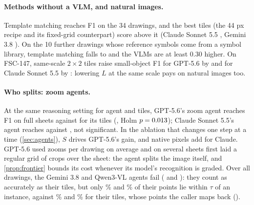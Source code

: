 \paragraph{Methods without a VLM, and natural images.} Template matching reaches \FTMdevAll{} F1 on the 34 drawings, and the best tiles (the 44 px recipe and its fixed-grid counterpart) score above it (Claude Sonnet 5.5 \FDsonnetFiveFiveAll, Gemini 3.8 \FDgemThreeEightAll). On the 10 further drawings whose reference symbols come from a symbol library, template matching falls to \XrdFTM{} and the VLMs are at least 0.30 higher. On FSC-147, same-scale $2 \times 2$ tiles raise small-object F1 for GPT-5.6 by \UfscODgptFiveSixsmallTU{} and for Claude Sonnet 5.5 by \UfscODsonnetFiveFivesmallTU{}: lowering $L$ at the same scale pays on natural images too.

\paragraph{Who splits: zoom agents.} At the same reasoning setting for agent and tiles, GPT-5.6's zoom agent reaches \XnFAGgptFiveSixSheets{} F1 on full sheets against \XnFDRgptFiveSixSheets{} for its tiles (\XnHOnegptFiveSix, Holm $p = 0.013$); Claude Sonnet 5.5's agent reaches \XnFAGsonnetFiveFiveSheets{} against \XnFDRsonnetFiveFiveSheets, not significant. In the ablation that changes one step at a time (\cref{sec:agents}), $S$ drives GPT-5.6's gain, and native pixels add \XnHThreesonnetFiveFiveAGOVZ{} for Claude. GPT-5.6 used \XagZoomsgptFiveSix{} zooms per drawing on average and on several sheets first laid a regular grid of crops over the sheet: the agent splits the image itself, and \cref{prop:frontier} bounds its cost whenever its model's recognition is graded. Over all drawings, the Gemini 3.8 and Qwen3-VL agents fail (\XagFgemThreeEightAll{} and \XqAgF): they count as accurately as their tiles, but only \CagLocGem\% and \CagLocQwen\% of their points lie within $\tau$ of an instance, against \CtileLocGem\% and \CtileLocQwen\% for their tiles, whose points the caller maps back ().
